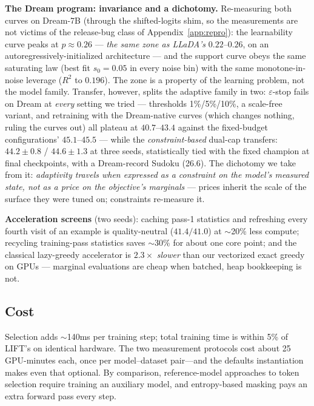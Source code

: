 \documentclass{article} %
\begin{document}
\textbf{The Dream program: invariance and a dichotomy.} Re-measuring both curves on Dream-7B (through the shifted-logits shim, so the measurements are not victims of the release-bug class of Appendix~\ref{app:repro}): the learnability curve peaks at $p \approx 0.26$ --- \emph{the same zone as LLaDA's} $0.22$--$0.26$, on an autoregressively-initialized architecture --- and the support curve obeys the same saturating law (best fit $s_0 = 0.05$ in every noise bin) with the same monotone-in-noise leverage ($R^2$ to $0.196$). The zone is a property of the learning problem, not the model family. Transfer, however, splits the adaptive family in two: $\varepsilon$-stop fails on Dream at \emph{every} setting we tried --- thresholds 1\%/5\%/10\%, a scale-free variant, and retraining with the Dream-native curves (which changes nothing, ruling the curves out) all plateau at $40.7$--$43.4$ against the fixed-budget configurations' $45.1$--$45.5$ --- while the \emph{constraint-based} dual-cap transfers: $44.2 \pm 0.8$ / $44.6 \pm 1.3$ at three seeds, statistically tied with the fixed champion at final checkpoints, with a Dream-record Sudoku (26.6). The dichotomy we take from it: \emph{adaptivity travels when expressed as a constraint on the model's measured state, not as a price on the objective's marginals} --- prices inherit the scale of the surface they were tuned on; constraints re-measure it.

\textbf{Acceleration screens} (two seeds): caching pass-1 statistics and refreshing every fourth visit of an example is quality-neutral ($41.4/41.0$) at $\sim$20\% less compute; recycling training-pass statistics saves $\sim$30\% for about one core point; and the classical lazy-greedy accelerator is $2.3\times$ \emph{slower} than our vectorized exact greedy on GPUs --- marginal evaluations are cheap when batched, heap bookkeeping is not.

\subsection{Cost}

Selection adds $\sim$140ms per training step; total training time is within 5\% of LIFT's on identical hardware. The two measurement protocols cost about 25 GPU-minutes each, once per model--dataset pair---and the defaults instantiation makes even that optional. By comparison, reference-model approaches to token selection require training an auxiliary model, and entropy-based masking pays an extra forward pass every step.
\end{document}
